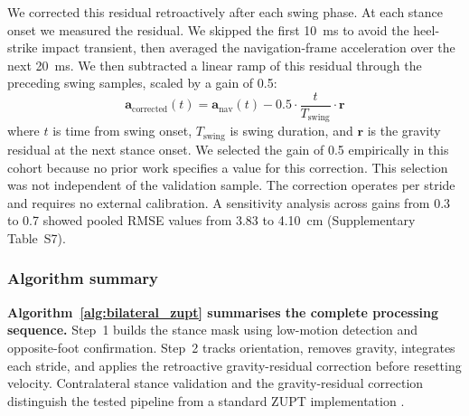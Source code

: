 \documentclass[11pt]{article}
\begin{document}
We corrected this residual retroactively after each swing phase. At each stance onset we measured the residual. We skipped the first 10~ms to avoid the heel-strike impact transient, then averaged the navigation-frame acceleration over the next 20~ms. We then subtracted a linear ramp of this residual through the preceding swing samples, scaled by a gain of 0.5:
\begin{equation}
\mathbf{a}_{\text{corrected}}(t) = \mathbf{a}_{\text{nav}}(t) - 0.5 \cdot \frac{t}{T_{\text{swing}}} \cdot \mathbf{r}
\end{equation}
where $t$ is time from swing onset, $T_{\text{swing}}$ is swing duration, and $\mathbf{r}$ is the gravity residual at the next stance onset. We selected the gain of 0.5 empirically in this cohort because no prior work specifies a value for this correction. This selection was not independent of the validation sample. The correction operates per stride and requires no external calibration. A sensitivity analysis across gains from 0.3 to 0.7 showed pooled RMSE values from 3.83 to 4.10~cm (Supplementary Table~S7).

\subsubsection{Algorithm summary}

\textbf{Algorithm~\ref{alg:bilateral_zupt} summarises the complete processing sequence.} Step~1 builds the stance mask using low-motion detection and opposite-foot confirmation. Step~2 tracks orientation, removes gravity, integrates each stride, and applies the retroactive gravity-residual correction before resetting velocity. Contralateral stance validation and the gravity-residual correction distinguish the tested pipeline from a standard ZUPT implementation \citep{Foxlin2005, Skog2010}.
\end{document}
